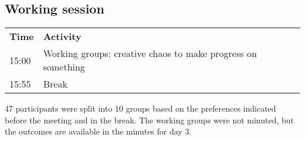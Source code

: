 \subsection{Working session}

\begin{table}[!h]
    \centering
    \begin{tabular}{@{}
        |p{}
        |p{}
        |@{}}
    \rowcolor{Task32Blue2} \textbf{Time} & \textbf{Activity} \\    
    15:00 & Working groups: creative chaos to make progress on something \\
    15:55 & Break
    \end{tabular}
    \label{tab:day2-workingsession-agenda}
\end{table}

47 participants were split into 10 groups based on the preferences indicated before the meeting and in the break. The working groups were not minuted, but the outcomes are available in the minutes for day 3.
